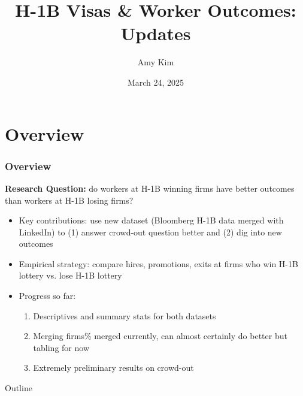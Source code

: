 \documentclass[xcolor=dvipsnames, compress, 12pt, aspectratio=169, handout]{beamer}
\title{H-1B Visas \& Worker Outcomes: Updates}
\author{Amy Kim}
\date{March 24, 2025}
\begin{document}
\begin{frame}[plain]
    \titlepage
\end{frame}

\section{Overview}
\begin{frame}
    \frametitle{Overview}
    \textbf{Research Question:} do workers at H-1B winning firms have better outcomes than workers at H-1B losing firms?
    \begin{itemize}
        \item Key contributions: use new dataset (Bloomberg H-1B data merged with LinkedIn) to (1) answer crowd-out question better and (2) dig into new outcomes
        \item Empirical strategy: compare hires, promotions, exits at firms who win H-1B lottery vs. lose H-1B lottery
        \item Progress so far:
        \begin{enumerate}
            \item Descriptives and summary stats for both datasets 
            \item Merging firms\% merged currently, can almost certainly do better but tabling for now
            \item Extremely preliminary results on crowd-out 
        \end{enumerate}
    \end{itemize}
\end{frame}
\begin{frame}[plain]{Outline}
    \tableofcontents
\end{frame}

\end{document}
